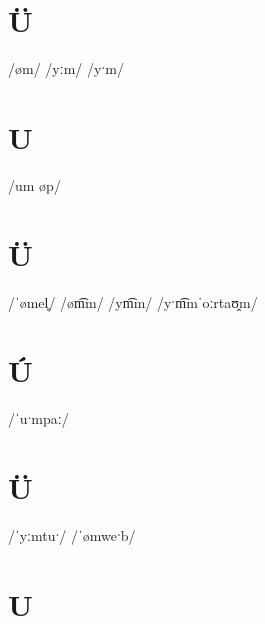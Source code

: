 \documentclass[10pt,a4paper,twoside]{book}
\begin{document}
\section*{Ü}

\begin{multicols}{3}
 {/øm/} {}
 {/yːm/} {}
 {/yˑm/} {}
\end{multicols}

\section*{U}

\begin{multicols}{3}
 {/um øp/} {}
\end{multicols}

\section*{Ü}

\begin{multicols}{3}
 {/ˈømel̥/} {}
 {/øm͡m/} {}
 {/ym͡m/} {}
 {/yˑm͡mˈoːrtaʊ̯m/} {}
\end{multicols}

\section*{Ú}

\begin{multicols}{3}
 {/ˈuˑmpaː/} {}
\end{multicols}

\section*{Ü}

\begin{multicols}{3}
 {/ˈyːmtuˑ/} {}
 {/ˈømweˑb/} {}
\end{multicols}

\section*{U}
\end{document}
